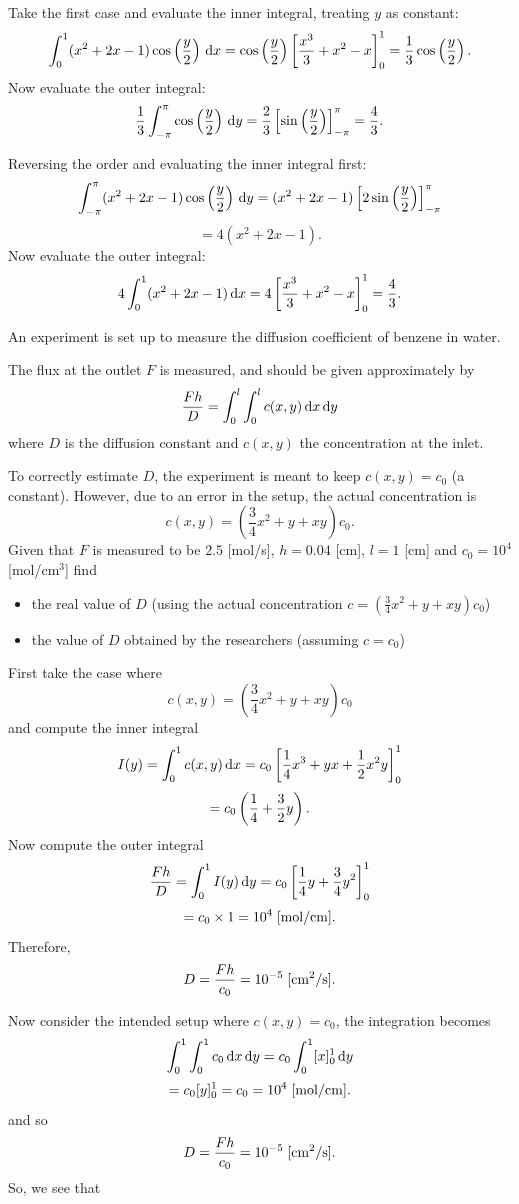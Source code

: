 \begin{blanksol}
Take the first case and evaluate the inner integral, treating $y$ as constant:
\[
\int_0^1(x^2+2x-1)\cos\left(\frac{y}{2}\right)\,{\rm d}x
=
\cos\left(\frac{y}{2}\right)
\left[\frac{x^3}{3}+x^2-x\right]_0^1
=
\frac{1}{3}\cos\left(\frac{y}{2}\right).
\]
Now evaluate the outer integral:
\[
\frac{1}{3}\int_{-\pi}^{\pi}\cos\left(\frac{y}{2}\right)\,{\rm d}y
=
\frac{2}{3}\left[\sin\left(\frac{y}{2}\right)\right]_{-\pi}^{\pi}
=
\frac{4}{3}.
\]

Reversing the order and evaluating the inner integral first:
\[
\int_{-\pi}^{\pi}(x^2+2x-1)\cos\left(\frac{y}{2}\right)\,{\rm d}y
=
(x^2+2x-1)
\left[2\sin\left(\frac{y}{2}\right)\right]_{-\pi}^{\pi}
\]
\[
=4(x^2+2x-1).
\]
Now evaluate the outer integral:
\[
4\int_0^1(x^2+2x-1)\,{\rm d}x
=
4\left[\frac{x^3}{3}+x^2-x\right]_0^1
=
\frac{4}{3}.
\]
\end{blanksol}

\begin{example}[Video]
An experiment is set up to measure the diffusion coefficient of benzene in water.

The flux at the outlet $F$ is measured, and should be given approximately by
\[
\frac{Fh}{D}=\int_0^l\int_0^l c(x,y)\,{\rm d}x\,{\rm d}y
\]
where $D$ is the diffusion constant and $c(x,y)$ the concentration at the inlet.

To correctly estimate $D$, the experiment is meant to keep $c(x,y)=c_0$ (a constant). However, due to an error in the setup, the actual concentration is
\[
c(x,y)=\left(\frac{3}{4}x^2+y+xy\right)c_0.
\]
Given that $F$ is measured to be $2.5$ [mol/s], $h=0.04$ [cm], $l=1$ [cm] and $c_0=10^4$ [mol/cm$^3$] find
\begin{itemize}
\item the real value of $D$ (using the actual concentration $c=\left(\frac{3}{4}x^2+y+xy\right)c_0$)
\item the value of $D$ obtained by the researchers (assuming $c=c_0$)
\end{itemize}
\end{example}

\begin{solution}
First take the case where
\[
c(x,y)=\left(\frac{3}{4}x^2+y+xy\right)c_0
\]
and compute the inner integral
\[
I(y)=\int_0^1c(x,y)\,{\rm d}x
=
c_0\left[\frac{1}{4}x^3+yx+\frac{1}{2}x^2y\right]_0^1
\]
\[
=c_0\left(\frac{1}{4}+\frac{3}{2}y\right).
\]
Now compute the outer integral
\[
\frac{Fh}{D}=\int_0^1I(y)\,{\rm d}y
=
c_0\left[\frac{1}{4}y+\frac{3}{4}y^2\right]_0^1
\]
\[
=c_0\times1=10^4\;[\mathrm{mol/cm}].
\]
Therefore,
\[
D=\frac{Fh}{c_0}=10^{-5}\;[\mathrm{cm}^2/\mathrm{s}].
\]

Now consider the intended setup where $c(x,y)=c_0$, the integration becomes
\[
\int_0^1\int_0^1c_0\,{\rm d}x\,{\rm d}y
=
c_0\int_0^1[x]_0^1\,{\rm d}y
\]
\[
=c_0[y]_0^1=c_0=10^4\;[\mathrm{mol/cm}].
\]
and so
\[
D=\frac{Fh}{c_0}=10^{-5}\;[\mathrm{cm}^2/\mathrm{s}].
\]
So, we see that 
\end{solution}

